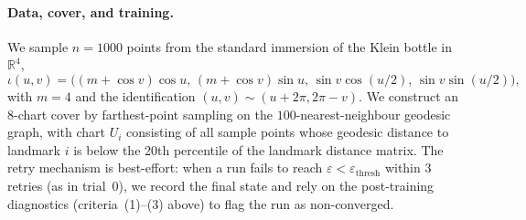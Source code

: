 \documentclass[11pt]{article}
\newcommand{\R}{\mathbb{R}}
\theoremstyle{plain}
\theoremstyle{definition}
\theoremstyle{remark}
\begin{document}
\paragraph{Data, cover, and training.}
We sample $n = 1000$ points from the standard immersion of the Klein bottle in $\R^4$,
\[
\iota(u, v) = \bigl((m + \cos v)\cos u,\, (m + \cos v)\sin u,\, \sin v \cos(u/2),\, \sin v \sin(u/2)\bigr),
\]
with $m = 4$ and the identification $(u, v) \sim (u + 2\pi, 2\pi - v)$. We construct an $8$-chart cover by farthest-point sampling on the $100$-nearest-neighbour geodesic graph, with chart $U_i$ consisting of all sample points whose geodesic distance to landmark $i$ is below the 20th percentile of the landmark distance matrix. The retry mechanism is best-effort: when a run fails to reach $\varepsilon < \varepsilon_{\mathrm{thresh}}$ within 3 retries (as in trial~0), we record the final state and rely on the post-training diagnostics (criteria~(1)--(3) above) to flag the run as non-converged.
\end{document}
